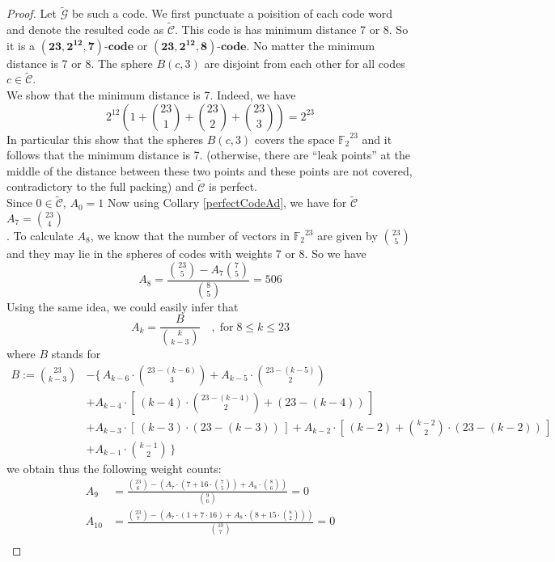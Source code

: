 \documentclass{article}
\numberwithin{equation}{theorem}
\numberwithin{figure}{theorem}
\newcommand{\cCodes}{\ensuremath{\widetilde{\mathscr{G}}}}
\newcommand{\tildcCodes}{\ensuremath{\widetilde{\mathscr{C}}}}
\newcommand{\code}[3]{\ensuremath{\bm{(#1,#2,#3)\mbox{-}code}}}
\newcommand{\ftwoN}[1]{\ensuremath{\mathbb{F}_2}^{#1}}
\begin{document}
\begin{proof}
Let {\cCodes} be such a code. We first punctuate a poisition 
of each code word and denote the resulted code as {\tildcCodes}.
This code is has minimum distance 7 or 8. So it is a {\code{23}{2^{12}}{7}} or {\code{23}{2^{12}}{8}}. No matter the minimum distance is 7 or 8. The sphere $B(c,3)$ are disjoint from each other for all codes $c \in \tildcCodes$.\\
We show that the minimum distance is 7.  Indeed, we have
\[
	2^{12}(1 + \binom{23}{1} + \binom{23}{2} + \binom{23}{3}) = 2^{23}
\]
In particular this show that the spheres $B(c,3)$ covers the space {$\ftwoN{23}$} and it follows that the minimum distance is 7. (otherwise, there are ``leak points'' at the middle of the distance between these two points and these points are not covered, contradictory to the full packing) and {\tildcCodes} is perfect.\\
Since $0 \in \tildcCodes$, $A_0 = 1$
Now using Collary \ref{perfectCodeAd}, we have for {\tildcCodes} $A_7 = \binom{23}{4}$\\.
To calculate $A_8$, we know that the number of vectors in $\ftwoN{23}$ are given by $\binom{23}{5}$ and they may lie in the spheres of codes with weights 7 or 8. So we have
\[
	A_8 = \frac{\binom{23}{5} - A_7\binom{7}{5}}{\binom{8}{5}} = 506
\]
Using the same idea, we could easily infer that
\begin{equation}\label{AxEqn}
	A_k = \frac{B}{\binom{k}{k-3}}\quad,\; \mbox{for}\; 8 \leq k \leq 23
\end{equation}
where $B$ stands for
\begin{align*}
B := \binom{23}{k-3} &- \{\,A_{k-6} \cdot \binom{23- (k - 6)}{3} + A_{k - 5} \cdot \binom{23 - (k - 5)}{2}\\ &+ A_{k - 4} \cdot \left[\,(k - 4)\cdot \binom{23 - (k-4)}{2} +
	(23 - (k-4))\,\right] \\&+ A_{k - 3} \cdot \left[\,(k - 3) \cdot (23 - (k - 3))\,\right] + A_{k - 2} \cdot \left[\,(k-2) + \binom{k - 2}{2} \cdot (23 - (k - 2))\,\right]\\ &+ A_{k-1} \cdot \binom{k-1}{2}\,\}
\end{align*}
we obtain thus the following weight counts:
	\begin{align*}
		A_9 &= \frac{\binom{23}{6} - (A_7 \cdot(7 + 16 \cdot \binom{7}{5}) + A_8\cdot \binom{8}{6})}{\binom{9}{6}} = 0\\
		A_{10} &= \frac{\binom{23}{7} - (A_7\cdot(1 + 7\cdot 16) + A_8\cdot(8 + 15 \cdot \binom{8}{2}))}{\binom{10}{7}} = 0 \\

\end{align*}
\end{proof}
\end{document}
